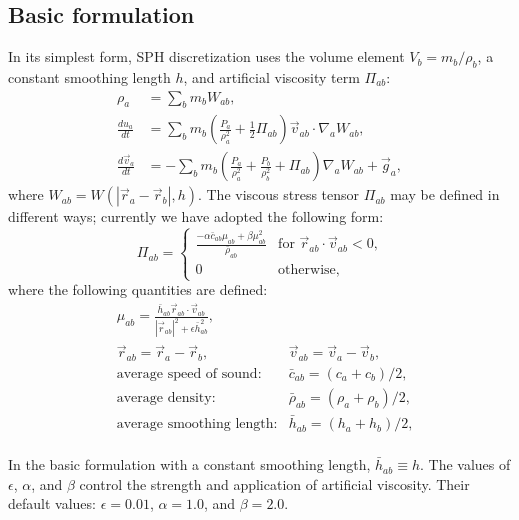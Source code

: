 \documentclass[notes.tex]{subfiles}
\begin{document}
\subsection{Basic formulation}
\label{sec:basic_formulation}

In its simplest form, SPH discretization uses the volume element 
$V_b = m_b / \rho_b$, a constant smoothing length $h$, and artificial
viscosity term $\Pi_{ab}$:
\begin{align}
  \rho_a &= \sum_b m_b W_{ab}, 
\\
  \frac{d u_a}{dt}  
      &= \sum_b m_b\left( 
           \frac{P_a}{\rho_a^2} + \frac12\Pi_{ab}
         \right)\vec{v}_{ab} \cdot \nabla_a W_{ab},
\label{eq:basic-dudt}
\\
  \frac{d \vec{v}_a}{d t} &= -\sum_b m_b 
      \left( \frac{P_a}{\rho_a^2} 
           + \frac{P_b}{\rho_b^2} 
           + \Pi_{ab} \right) \nabla_a W_{ab}
       + \vec{g}_a,
\label{eq:basic-dvdt}
\end{align}
where $W_{ab} = W(|\vec{r}_a - \vec{r}_b|,h)$.
The viscous stress tensor $\Pi_{ab}$ may be defined in different ways;
currently we have adopted the following form:
\begin{equation}
\Pi_{ab} = 
\begin{cases}
  \frac{- \alpha \bar{c}_{ab} \mu_{ab} + \beta \mu_{ab}^2}{\bar{\rho}_{ab}} 
    & \text{for $\vec{r}_{ab} \cdot \vec{v}_{ab} < 0$,} \\
  0 & \text{otherwise,}
\end{cases}
\end{equation}
where the following quantities are defined: 
\begin{align}
  &\mu_{ab} = \frac{\bar{h}_{ab} \vec{r}_{ab} \cdot \vec{v}_{ab}}
                   {|\vec{r}_{ab}|^2 + \epsilon \bar{h}_{ab}^2}, 
   \label{eq:visc_mu}\\
  &\vec{r}_{ab} = \vec{r}_a - \vec{r}_b, &\vec{v}_{ab} = \vec{v}_a - \vec{v}_b,\\
  &\text{average speed of sound:} &\bar{c}_{ab} = (c_a + c_b)/2, \\
  &\text{average density:}        &\bar{\rho}_{ab} = (\rho_a + \rho_b)/2,\\
  &\text{average smoothing length:} &\bar{h}_{ab} = (h_a + h_b)/2,\\
\end{align}

In the basic formulation with a constant smoothing length, $\bar{h}_{ab}\equiv h$.
The values of $\epsilon$, $\alpha$, and $\beta$ control the strength and
application of artificial viscosity. Their default values:
$\epsilon = 0.01$, $\alpha = 1.0$, and $\beta = 2.0$.
\end{document}
